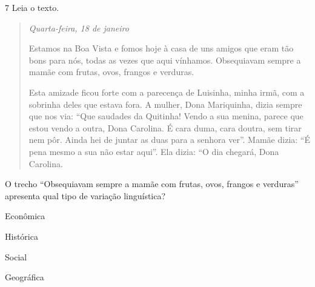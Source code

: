 \num{7} Leia o texto.

\begin{quote}
\noindent \emph{Quarta-feira, 18 de janeiro}

\noindent Estamos na Boa Vista e fomos hoje à casa de uns amigos que eram tão bons
para nós, todas as vezes que aqui vínhamos. Obsequiavam sempre a mamãe
com frutas, ovos, frangos e verduras.

Esta amizade ficou forte com a parecença de Luisinha, minha irmã, com a
sobrinha deles que estava fora. A mulher, Dona Mariquinha, dizia sempre
que nos via: ``Que saudades da Quitinha! Vendo a sua menina, parece que
estou vendo a outra, Dona Carolina. É cara duma, cara doutra, sem tirar
nem pôr. Ainda hei de juntar as duas para a senhora ver''. Mamãe dizia:
``É pena mesmo a sua não estar aqui''. Ela dizia: ``O dia chegará, Dona
Carolina.

\end{quote}

\noindent O trecho ``Obsequiavam sempre a mamãe com frutas, ovos, frangos e
verduras'' apresenta qual tipo de variação linguística?

\begin{escolha}
\item Econômica 
\item Histórica 
\item Social 
\item Geográfica
\end{escolha}



